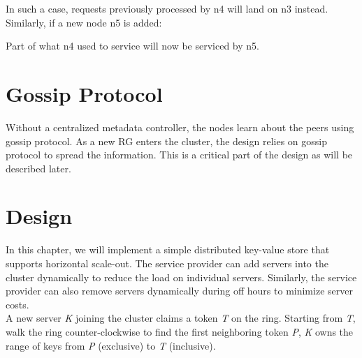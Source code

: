 In such a case, requests previously processed by n4 will land on n3 instead.
Similarly, if a new node n5 is added:

\begin{center}
\end{center}

Part of what n4 used to service will now be serviced by n5.

\section{Gossip Protocol}

Without a centralized metadata controller, the nodes learn about the peers using
gossip protocol. As a new RG enters the cluster, the design relies on gossip
protocol to spread the information. This is a critical part of the design as
will be described later.

\section{Design}

In this chapter, we will implement a simple distributed key-value store that
supports horizontal scale-out. The service provider can add servers into the
cluster dynamically to reduce the load on individual servers. Similarly, the
service provider can also remove servers dynamically during off hours to
minimize server costs.\\

A new server \textit{K} joining the cluster claims a token \textit{T} on the
ring. Starting from \textit{T}, walk the ring counter-clockwise to find the
first neighboring token \textit{P}, \textit{K} owns the range of keys from
\textit{P} (exclusive) to \textit{T} (inclusive).\\

